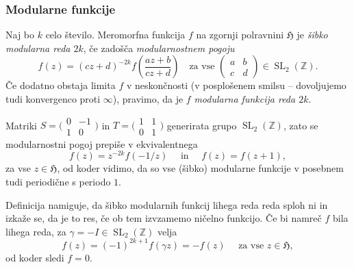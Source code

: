 \documentclass[mat1]{fmfdelo}
\numberwithin{equation}{section}
\newcommand{\Z}{\mathbb Z}
\newcommand{\HH}{\mathfrak{H}}
\newcommand{\SL}{\Gamma}
\newcommand{\pabcd}{\begin{pmatrix} a & b \\ c & d \end{pmatrix}}
\newcommand{\ti}{t.~i.\ }
\theoremstyle{definition}
\begin{document}
\subsubsection{Modularne funkcije}

\begin{definicija}
    Naj bo $k$ celo število. Meromorfna funkcija $f$ na zgornji polravnini $\HH$ je \emph{šibko modularna reda $2k$}, če zadošča \emph{modularnostnem pogoju}
    \begin{equation}
        \label{eq: modularnostni pogoj}
        f(z) = (cz + d)^{-2k} f\left(\frac{az + b}{cz + d}\right) \quad \text{za vse } \pabcd \in \operatorname{SL}_2(\Z).
    \end{equation}
    Če dodatno obstaja limita $f$ v neskončnosti (v posplošenem smilsu -- dovoljujemo tudi konvergenco proti $\infty$), pravimo, da je $f$ \emph{modularna funkcija reda $2k$}. 
\end{definicija}

\begin{opomba}
    Matriki $S = \big(\begin{smallmatrix} 0 & -1\\1 & 0 \end{smallmatrix}\big)$ in $T = \big(\begin{smallmatrix} 1 & 1\\0 & 1 \end{smallmatrix}\big)$ generirata grupo $\operatorname{SL}_2(\Z)$, zato se modularnostni pogoj prepiše v ekvivalentnega
    \[
        f(z) = z^{-2k}f\left(-1/z\right) \quad \text{ in } \quad f(z) = f(z + 1),
    \] 
    za vse $z \in \HH$, od koder vidimo, da so vse (šibko) modularne funkcije v posebnem tudi periodične s periodo $1$.
\end{opomba}

\begin{opomba}
    Definicija namiguje, da šibko modularnih funkcij lihega reda reda sploh ni in izkaže se, da je to res, če ob tem izvzamemo ničelno funkcijo. Če bi namreč $f$ bila lihega reda, za $\gamma = -I \in \operatorname{SL}_2(\Z)$ velja
    \[
        f(z) = (-1)^{2k+1}f(\gamma z) = -f(z) \quad \text{ za vse } z \in \HH,
    \]
    od koder sledi $f=0$.
\end{opomba}
\end{document}
